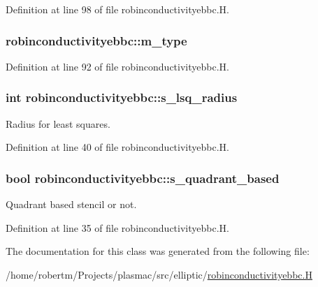 Definition at line 98 of file robinconductivityebbc.\+H.

\subsubsection[{\texorpdfstring{m\+\_\+type}{m_type}}]{ robinconductivityebbc\+::m\+\_\+type\hspace{0.3cm}{\ttfamily [protected]}}\hypertarget{classrobinconductivityebbc_a51c381343f6742475b9255fb1a0aed1d}{}\label{classrobinconductivityebbc_a51c381343f6742475b9255fb1a0aed1d}


Definition at line 92 of file robinconductivityebbc.\+H.

\subsubsection[{\texorpdfstring{s\+\_\+lsq\+\_\+radius}{s_lsq_radius}}]{\setlength{\rightskip}{0pt plus 5cm}int robinconductivityebbc\+::s\+\_\+lsq\+\_\+radius\hspace{0.3cm}{\ttfamily [static]}}\hypertarget{classrobinconductivityebbc_aeb64ed54a5a9dee936731b3be7dba6ca}{}\label{classrobinconductivityebbc_aeb64ed54a5a9dee936731b3be7dba6ca}


Radius for least squares. 



Definition at line 40 of file robinconductivityebbc.\+H.

\subsubsection[{\texorpdfstring{s\+\_\+quadrant\+\_\+based}{s_quadrant_based}}]{\setlength{\rightskip}{0pt plus 5cm}bool robinconductivityebbc\+::s\+\_\+quadrant\+\_\+based\hspace{0.3cm}{\ttfamily [static]}}\hypertarget{classrobinconductivityebbc_aaa2b49a3ee0cc87551dd7df63c2f191b}{}\label{classrobinconductivityebbc_aaa2b49a3ee0cc87551dd7df63c2f191b}


Quadrant based stencil or not. 



Definition at line 35 of file robinconductivityebbc.\+H.



The documentation for this class was generated from the following file\+:\begin{DoxyCompactItemize}
\item 
/home/robertm/\+Projects/plasmac/src/elliptic/\hyperlink{robinconductivityebbc_8H}{robinconductivityebbc.\+H}\end{DoxyCompactItemize}
